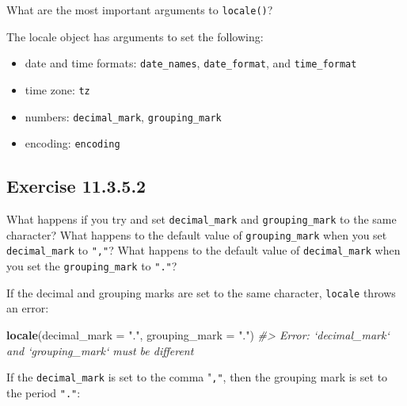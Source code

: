 \documentclass[]{book}
\newenvironment{Shaded}{\begin{snugshade}}{\end{snugshade}}
\newcommand{\CommentTok}[1]{\textcolor[rgb]{0.56,0.35,0.01}{\textit{#1}}}
\newcommand{\DataTypeTok}[1]{\textcolor[rgb]{0.13,0.29,0.53}{#1}}
\newcommand{\KeywordTok}[1]{\textcolor[rgb]{0.13,0.29,0.53}{\textbf{#1}}}
\newcommand{\NormalTok}[1]{#1}
\newcommand{\StringTok}[1]{\textcolor[rgb]{0.31,0.60,0.02}{#1}}
\providecommand{\tightlist}{%
  \setlength{\itemsep}{0pt}\setlength{\parskip}{0pt}}
\theoremstyle{plain}
\theoremstyle{remark}
\begin{document}
What are the most important arguments to \texttt{locale()}?

The locale object has arguments to set the following:

\begin{itemize}
\tightlist
\item
  date and time formats: \texttt{date\_names}, \texttt{date\_format}, and \texttt{time\_format}
\item
  time zone: \texttt{tz}
\item
  numbers: \texttt{decimal\_mark}, \texttt{grouping\_mark}
\item
  encoding: \texttt{encoding}
\end{itemize}

\hypertarget{exercise-11.3.5.2}{%
\subsection*{\texorpdfstring{Exercise {11.3.5.2}}{Exercise 11.3.5.2}}\label{exercise-11.3.5.2}}

What happens if you try and set \texttt{decimal\_mark} and \texttt{grouping\_mark} to the same character?
What happens to the default value of \texttt{grouping\_mark} when you set \texttt{decimal\_mark} to \texttt{","}?
What happens to the default value of \texttt{decimal\_mark} when you set the \texttt{grouping\_mark} to \texttt{"."}?

If the decimal and grouping marks are set to the same character, \texttt{locale} throws an error:

\begin{Shaded}
\begin{Highlighting}[]
\KeywordTok{locale}\NormalTok{(}\DataTypeTok{decimal_mark =} \StringTok{"."}\NormalTok{, }\DataTypeTok{grouping_mark =} \StringTok{"."}\NormalTok{)}
\CommentTok{#> Error: `decimal_mark` and `grouping_mark` must be different}
\end{Highlighting}
\end{Shaded}

If the \texttt{decimal\_mark} is set to the comma "\texttt{,"}, then the grouping mark is set to the period \texttt{"."}:

\begin{Shaded}
\end{Shaded}
\end{document}
